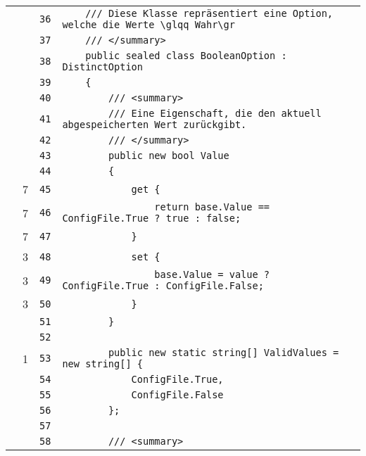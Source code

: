 \documentclass[a4paper,10pt]{article}
\begin{document}
\begin{longtable}[l]{lrrl}
\cellcolor{gray} &  & \verb~36~ & \verb~    /// Diese Klasse repräsentiert eine Option, welche die Werte \glqq Wahr\gr~\\
\cellcolor{gray} &  & \verb~37~ & \verb~    /// </summary>~\\
\cellcolor{gray} &  & \verb~38~ & \verb~    public sealed class BooleanOption : DistinctOption~\\
\cellcolor{gray} &  & \verb~39~ & \verb~    {~\\
\cellcolor{gray} &  & \verb~40~ & \verb~        /// <summary>~\\
\cellcolor{gray} &  & \verb~41~ & \verb~        /// Eine Eigenschaft, die den aktuell abgespeicherten Wert zurückgibt.~\\
\cellcolor{gray} &  & \verb~42~ & \verb~        /// </summary>~\\
\cellcolor{gray} &  & \verb~43~ & \verb~        public new bool Value~\\
\cellcolor{gray} &  & \verb~44~ & \verb~        {~\\
\cellcolor{green} & 7 & \verb~45~ & \verb~            get {~\\
\cellcolor{green} & 7 & \verb~46~ & \verb~                return base.Value == ConfigFile.True ? true : false;~\\
\cellcolor{green} & 7 & \verb~47~ & \verb~            }~\\
\cellcolor{green} & 3 & \verb~48~ & \verb~            set {~\\
\cellcolor{green} & 3 & \verb~49~ & \verb~                base.Value = value ? ConfigFile.True : ConfigFile.False;~\\
\cellcolor{green} & 3 & \verb~50~ & \verb~            }~\\
\cellcolor{gray} &  & \verb~51~ & \verb~        }~\\
\cellcolor{gray} &  & \verb~52~ & \verb~~\\
\cellcolor{green} & 1 & \verb~53~ & \verb~        public new static string[] ValidValues = new string[] {~\\
\cellcolor{gray} &  & \verb~54~ & \verb~            ConfigFile.True,~\\
\cellcolor{gray} &  & \verb~55~ & \verb~            ConfigFile.False~\\
\cellcolor{gray} &  & \verb~56~ & \verb~        };~\\
\cellcolor{gray} &  & \verb~57~ & \verb~~\\
\cellcolor{gray} &  & \verb~58~ & \verb~        /// <summary>~\\

\end{longtable}
\end{document}
